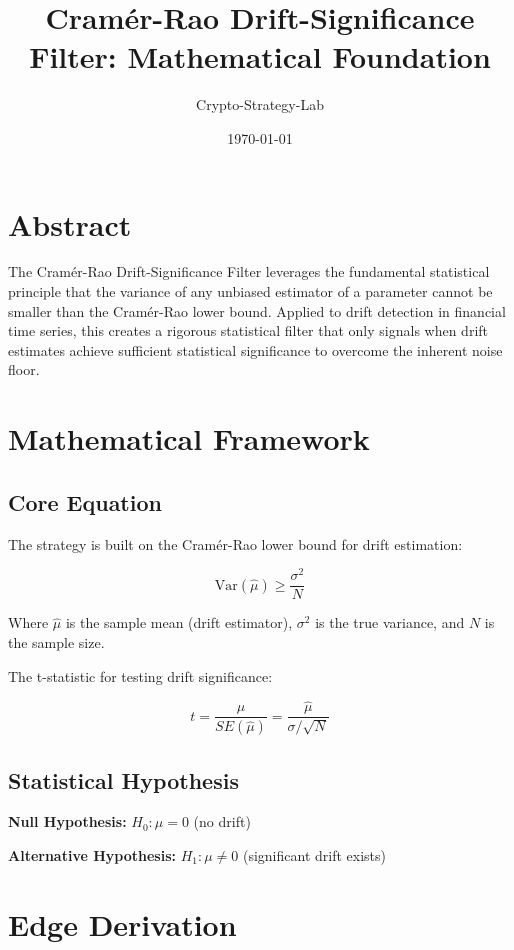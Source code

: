 \documentclass{article}
\title{Cramér-Rao Drift-Significance Filter: Mathematical Foundation}
\author{Crypto-Strategy-Lab}
\date{\today}
\begin{document}
\maketitle

\section{Abstract}

The Cramér-Rao Drift-Significance Filter leverages the fundamental statistical principle that the variance of any unbiased estimator of a parameter cannot be smaller than the Cramér-Rao lower bound. Applied to drift detection in financial time series, this creates a rigorous statistical filter that only signals when drift estimates achieve sufficient statistical significance to overcome the inherent noise floor.

\section{Mathematical Framework}

\subsection{Core Equation}

The strategy is built on the Cramér-Rao lower bound for drift estimation:

\begin{equation}
\text{Var}(\hat{\mu}) \geq \frac{\sigma^2}{N}
\end{equation}

Where $\hat{\mu}$ is the sample mean (drift estimator), $\sigma^2$ is the true variance, and $N$ is the sample size.

The t-statistic for testing drift significance:

\begin{equation}
t = \frac{\hat{\mu}}{SE(\hat{\mu})} = \frac{\hat{\mu}}{\sigma/\sqrt{N}}
\end{equation}

\subsection{Statistical Hypothesis}

\textbf{Null Hypothesis:} $H_0: \mu = 0$ (no drift)

\textbf{Alternative Hypothesis:} $H_1: \mu \neq 0$ (significant drift exists)

\section{Edge Derivation}
\end{document}
